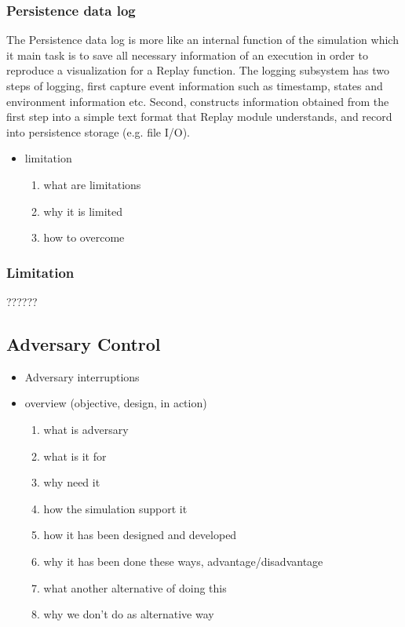 \subsubsection*{Persistence data log}
The Persistence data log is more like an internal function of the simulation which it main task is to save all necessary information of an execution in order to reproduce a visualization for a Replay function. The logging subsystem has two steps of logging, first capture event information such as timestamp, states and environment information etc. Second, constructs information obtained from the first step into a simple text format that Replay module understands, and record into persistence storage (e.g. file I/O).


\begin{itemize}
\item limitation
    \begin{enumerate}
    \item what are limitations
    \item why it is limited
    \item how to overcome
    \end{enumerate}
\end{itemize}

\subsubsection*{Limitation}

??????


\subsection{Adversary Control}

\begin{itemize}
\item Adversary interruptions
\item overview (objective, design, in action)
    \begin{enumerate}
    \item what is adversary
    \item what is it for
    \item why need it
    \item how the simulation support it
    \item how it has been designed and developed
    \item why it has been done these ways, advantage/disadvantage
    \item what another alternative of doing this
    \item why we don't do as alternative way
    \end{enumerate}
\end{itemize}


